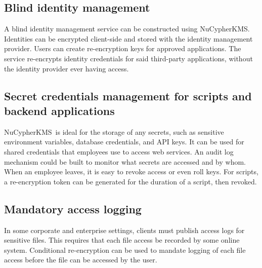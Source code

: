 \documentclass[notitlepage,longbibliography]{revtex4-1}
\newcommand{\kms}{NuCypherKMS}
\begin{document}
\subsection{Blind identity management}
A blind identity management service can be constructed using \kms. Identities can be encrypted client-side and stored with the
identity management provider. Users can create re-encryption keys for approved applications. The service re-encrypts identity
credentials for said third-party applications, without the identity provider ever having access.

\subsection{Secret credentials management for scripts and backend applications}
\kms~is ideal for the storage of any secrets, such as sensitive environment variables, database credentials, and API keys.
It can be used for shared credentials that employees use to access web services.
An audit log mechanism could be built to monitor what secrets are accessed and by whom.
When an employee leaves, it is easy to revoke access or even roll keys.
For scripts, a re-encryption token can be generated for the duration of a script, then revoked.

\subsection{Mandatory access logging}
In some corporate and enterprise settings, clients must publish access logs for sensitive files.
This requires that each file access be recorded by some online system.
Conditional re-encryption can be used to mandate logging of each file access before the file can be accessed by the user.


\end{document}
